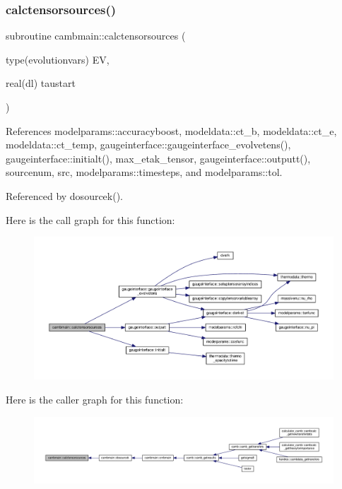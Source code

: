 \subsubsection{\texorpdfstring{calctensorsources()}{calctensorsources()}}
{\footnotesize\ttfamily subroutine cambmain\+::calctensorsources (\begin{DoxyParamCaption}\item[{type(evolutionvars)}]{EV,  }\item[{real(dl)}]{taustart }\end{DoxyParamCaption})}



References modelparams\+::accuracyboost, modeldata\+::ct\+\_\+b, modeldata\+::ct\+\_\+e, modeldata\+::ct\+\_\+temp, gaugeinterface\+::gaugeinterface\+\_\+evolvetens(), gaugeinterface\+::initialt(), max\+\_\+etak\+\_\+tensor, gaugeinterface\+::outputt(), sourcenum, src, modelparams\+::timesteps, and modelparams\+::tol.



Referenced by dosourcek().

Here is the call graph for this function\+:
\nopagebreak
\begin{figure}[H]
\begin{center}
\leavevmode
\includegraphics[width=350pt]{namespacecambmain_ad933d804e4a0a4ae8bdf2754e608458d_cgraph}
\end{center}
\end{figure}
Here is the caller graph for this function\+:
\nopagebreak
\begin{figure}[H]
\begin{center}
\leavevmode
\includegraphics[width=350pt]{namespacecambmain_ad933d804e4a0a4ae8bdf2754e608458d_icgraph}
\end{center}
\end{figure}
\mbox{\label{namespacecambmain_a709092859c794b6298b580be81ff9a90}} 
